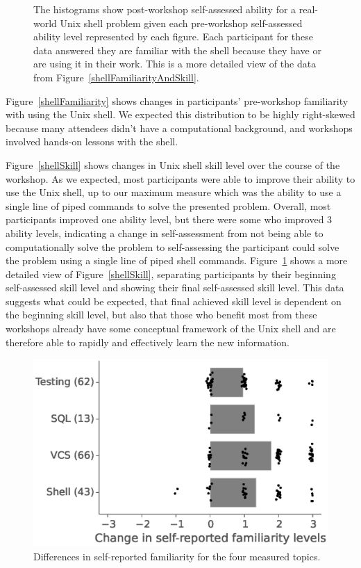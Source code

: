 \documentclass[10pt, twocolumn]{article}
\begin{document}
\begin{figure}[t]
\begin{subfigure}[c]{2.1in}
    \end{subfigure}
\caption{
  The histograms show post-workshop self-assessed ability for a real-world Unix shell problem
  given each pre-workshop self-assessed ability level represented by each figure.
  Each participant for these data answered they are familiar with the shell because they have or are using it in their work.
  This is a more detailed view of the data from Figure~\ref{shellFamiliarityAndSkill}.
\label{shellDetailSkill}}

\end{figure}

Figure~\ref{shellFamiliarity} shows changes in participants' pre-workshop familiarity with using the Unix shell.
We expected this distribution to be highly right-skewed because
many attendees didn't have a computational background,
and workshops involved hands-on lessons with the shell.

Figure~\ref{shellSkill} shows changes in Unix shell skill level over the course of the workshop.
As we expected, most participants were able to improve their ability to use the Unix shell,
up to our maximum measure
which was the ability to use a single line of piped commands to solve the presented problem.
Overall, most participants improved one ability level,
but there were some who improved 3 ability levels,
indicating a change in self-assessment from not being able to computationally solve the problem
to self-assessing the participant could solve the problem using a single line of piped shell commands.
Figure~\ref{shellDetailSkill} shows a more detailed view of Figure~\ref{shellSkill},
separating participants by their beginning self-assessed skill level
and showing their final self-assessed skill level.
This data suggests what could be expected, 
that final achieved skill level is dependent on the beginning skill level,
but also that those who benefit most from these workshops
already have some conceptual framework of the Unix shell
and are therefore able to rapidly and effectively learn
the new information.

\begin{figure}
\centering
\includegraphics[width=\linewidth]{AvgFamiliarityEffect}
\caption{
    Differences in self-reported familiarity for the four measured topics.
\label{AvgFamiliarityEffect}}

\end{figure}
\end{document}
